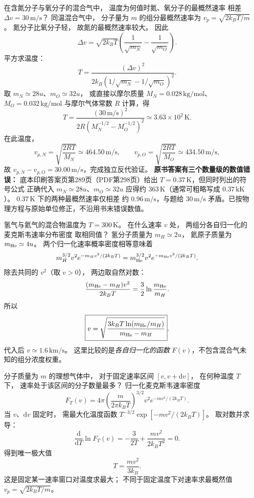 在含氮分子与氧分子的混合气中，
温度为何值时氮、氧分子的最概然速率
相差 $\Delta v=30\,\mathrm{m/s}$？
\exsolution
同温混合气中，
分子量为 $m$ 的组分最概然速率为
$v_p=\sqrt{2k_BT/m}$。
氮分子比氧分子轻，
故氮的最概然速率较大。
因此
\[
\Delta v=\sqrt{2k_BT}
\left(\frac1{\sqrt{m_N}}-\frac1{\sqrt{m_O}}\right).
\]
平方求温度：
\[
\boxed{T=\frac{(\Delta v)^2}
{2k_B(1/\sqrt{m_N}-1/\sqrt{m_O})^2}}.
\]
取 $m_N\simeq28u$、$m_O\simeq32u$，
或直接以摩尔质量 $M_N=0.028\,\mathrm{kg/mol}$、
$M_O=0.032\,\mathrm{kg/mol}$ 与摩尔气体常数 $R$
计算，得
\[
T=\frac{(30\,\mathrm{m/s})^2}{
2R\left(M_N^{-1/2}-M_O^{-1/2}\right)^2}
\simeq\boxed{3.63\times10^2\,\mathrm K}.
\]
在此温度，
\[
v_{p,N}=\sqrt{\frac{2RT}{M_N}}
\simeq464.50\,\mathrm{m/s},\qquad
v_{p,O}=\sqrt{\frac{2RT}{M_O}}
\simeq434.50\,\mathrm{m/s},
\]
故 $v_{p,N}-v_{p,O}=30.00\,\mathrm{m/s}$，完成独立反代验证。
\excheck \textbf{原书答案有三个数量级的数值错误：}
底本印刷答案页第289页（PDF第298页）给出
$T=0.37\,\mathrm K$，但同时列出的符号公式
正确代入 $m_N\simeq28u$、$m_O\simeq32u$
应得约 $363\,\mathrm K$（通常可粗略写成 $0.37\,\mathrm{kK}$）。
$0.37\,\mathrm K$ 下的两种最概然速率仅相差
约 $0.96\,\mathrm{m/s}$，与题给 $30\,\mathrm{m/s}$
矛盾。已按物理方程与原始单位修正，不沿用书末错误数值。

氢气与氦气的混合物温度为
$T=300\,\mathrm K$。
在什么速率 $v$ 处，
两组分各自归一化的麦克斯韦速率分布密度
取相同值？
\exsolution
氢分子质量为 $m_H\simeq2u$，
氦原子质量为 $m_{\rm He}\simeq4u$。
两个归一化速率概率密度相等意味着
\[
m_H^{3/2}v^2e^{-m_Hv^2/(2k_BT)}
=m_{\rm He}^{3/2}v^2e^{-m_{\rm He}v^2/(2k_BT)}.
\]
除去共同的 $v^2$（取 $v>0$），
两边取自然对数：
\[
\frac{(m_{\rm He}-m_H)v^2}{2k_BT}
=\frac32\ln\frac{m_{\rm He}}{m_H}.
\]
所以
\[
\boxed{v=
\sqrt{\frac{3k_BT\ln(m_{\rm He}/m_H)}
{m_{\rm He}-m_H}}}.
\]
代入后
$\boxed{v\simeq1.6\,\mathrm{km/s}}$。
\excheck 这里比较的是\emph{各自归一化的函数}
$F(v)$，不包含混合气未知的组分浓度权重。

分子质量为 $m$ 的理想气体中，
对于固定速率区间 $[v,v+\mathrm dv]$，
在何种温度 $T$ 下，
速率处于该区间的分子数量最多？
\exsolution
归一化麦克斯韦速率密度
\[
F_T(v)=
4\pi\left(\frac m{2\pi k_BT}\right)^{3/2}
v^2e^{-mv^2/(2k_BT)}.
\]
当 $v$、$\mathrm dv$ 固定时，
需最大化温度函数
$T^{-3/2}\exp[-mv^2/(2k_BT)]$。
取对数并求导：
\[
\frac{\mathrm d}{\mathrm dT}\ln F_T(v)
=-\frac3{2T}+\frac{mv^2}{2k_BT^2}=0.
\]
得到唯一极大值
\[
\boxed{T=\frac{mv^2}{3k_B}}.
\]
\excheck 这是固定某一速率窗口对温度求最大；
不同于固定温度下对速率求最概然值
$v_p=\sqrt{2k_BT/m}$。

